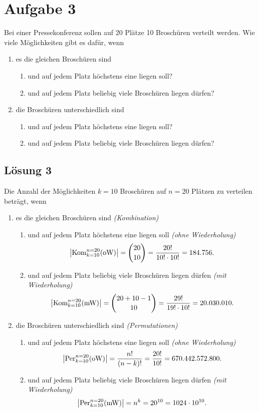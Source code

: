 \documentclass[main.tex]{subfiles}
\begin{document}
\section{Aufgabe 3}
Bei einer Pressekonferenz sollen auf 20 Plätze 10 Broschüren verteilt werden. Wie viele Möglichkeiten gibt es dafür, wenn

\begin{enumerate}
    \item es die gleichen Broschüren sind
    \begin{enumerate}
        \item und auf jedem Platz höchstens eine liegen soll?
        \item und auf jedem Platz beliebig viele Broschüren liegen dürfen?
    \end{enumerate}
    \item die Broschüren unterschiedlich sind
    \begin{enumerate}
        \item und auf jedem Platz höchstens eine liegen soll?
        \item und auf jedem Platz beliebig viele Broschüren liegen dürfen?
    \end{enumerate}
\end{enumerate}

\subsection{Lösung 3}
Die Anzahl der Möglichkeiten $k=10$ Broschüren auf $n=20$ Plätzen zu verteilen beträgt, wenn

\begin{enumerate}
    \item es die gleichen Broschüren sind \textit{(Kombination)}
    \begin{enumerate}
        \item und auf jedem Platz höchstens eine liegen soll \textit{(ohne Wiederholung)}
        $$ \abs*{\text{Kom}^{n=20}_{k=10}(\text{oW})} = \binom{20}{10} = \frac{20!}{10!\cdot 10!} = 184.756. $$
        \item und auf jedem Platz beliebig viele Broschüren liegen dürfen \textit{(mit Wiederholung)}
        $$ \abs*{\text{Kom}^{n=20}_{k=10}(\text{mW})} = \binom{20+10-1}{10} = \frac{29!}{19!\cdot 10!} = 20.030.010. $$
    \end{enumerate}
    \item die Broschüren unterschiedlich sind \textit{(Permutationen)}
    \begin{enumerate}
        \item und auf jedem Platz höchstens eine liegen soll \textit{(ohne Wiederholung)}
        $$ \abs*{\text{Per}^{n=20}_{k=10}(\text{oW})} = \frac{n!}{(n-k)!} = \frac{20!}{10!} = 670.442.572.800. $$
        \item und auf jedem Platz beliebig viele Broschüren liegen dürfen \textit{(mit Wiederholung)}
        $$ \abs*{\text{Per}^{n=20}_{k=10}(\text{mW})} = n^k = 20^{10} = 1024\cdot 10^{10}. $$
    \end{enumerate}
\end{enumerate}
\end{document}

